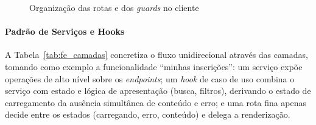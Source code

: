 \begin{figure}[H]
\centering
\caption{Organização das rotas e dos \textit{guards} no cliente}
\label{fig:fe_rotas_guards}
\setlength{\fboxsep}{8pt}
\end{figure}

\paragraph{Padrão de Serviços e Hooks}

A Tabela~\ref{tab:fe_camadas} concretiza o fluxo unidirecional através das camadas, tomando como exemplo a funcionalidade ``minhas inscrições'': um serviço expõe operações de alto nível sobre os \textit{endpoints}; um \textit{hook} de caso de uso combina o serviço com estado e lógica de apresentação (busca, filtros), derivando o estado de carregamento da ausência simultânea de conteúdo e erro; e uma rota fina apenas decide entre os estados (carregando, erro, conteúdo) e delega a renderização.

